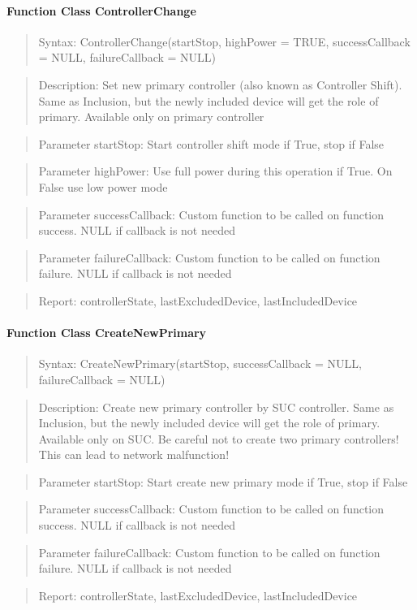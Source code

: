 \paragraph{Function Class ControllerChange}
\begin{quote}Syntax: ControllerChange(startStop, highPower = TRUE, successCallback = NULL, failureCallback = NULL)\end{quote}
\begin{quote}Description: Set new primary controller (also known as Controller Shift). Same as Inclusion, but the newly included device will get the role of primary. Available only on primary controller\end{quote}
\begin{quote}Parameter startStop: Start controller shift mode if True, stop if False\end{quote}
\begin{quote}Parameter highPower: Use full power during this operation if True. On False use low power mode\end{quote}
\begin{quote}Parameter successCallback: Custom function to be called on function success. NULL if callback is not needed\end{quote}
\begin{quote}Parameter failureCallback: Custom function to be called on function failure. NULL if callback is not needed\end{quote}
\begin{quote}Report: controllerState, lastExcludedDevice, lastIncludedDevice\end{quote}

\paragraph{Function Class CreateNewPrimary}
\begin{quote}Syntax: CreateNewPrimary(startStop, successCallback = NULL, failureCallback = NULL)\end{quote}
\begin{quote}Description: Create new primary controller by SUC controller. Same as Inclusion, but the newly included device will get the role of primary. Available only on SUC. Be careful not to create two primary controllers! This can lead to network malfunction!\end{quote}
\begin{quote}Parameter startStop: Start create new primary mode if True, stop if False\end{quote}
\begin{quote}Parameter successCallback: Custom function to be called on function success. NULL if callback is not needed\end{quote}
\begin{quote}Parameter failureCallback: Custom function to be called on function failure. NULL if callback is not needed\end{quote}
\begin{quote}Report: controllerState, lastExcludedDevice, lastIncludedDevice\end{quote}

